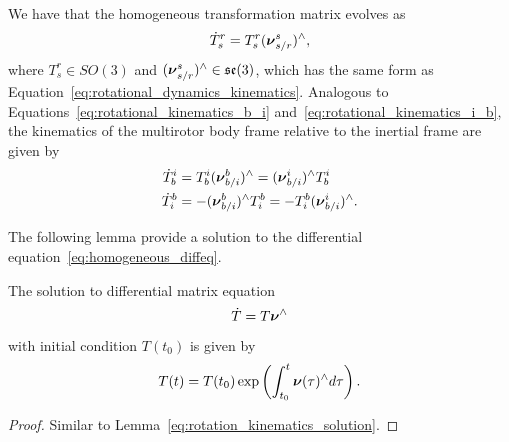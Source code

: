 We have that the homogeneous transformation matrix evolves as
\begin{equation}\label{eq:homogeneous_diffeq}
\dot{T}_s^r = T_s^r (\nubf_{s/r}^s)^\wedge,
\end{equation}
where $T_s^r\in SO(3)$ and $(\boldsymbol{\nu}_{s/r}^s)^\wedge\in\mathfrak{se}(3)$, 
which has the same form as Equation~\eqref{eq:rotational_dynamics_kinematics}.  Analogous to Equations~\eqref{eq:rotational_kinematics_b_i} and~\eqref{eq:rotational_kinematics_i_b}, the kinematics of the multirotor body frame relative to the inertial frame are given by
\begin{align}
\dot{T}_b^i &= T_b^i (\nubf_{b/i}^b)^\wedge = (\nubf_{b/i}^i)^\wedge T_b^i \label{eq:homogeneous_kinematics_b_i} \\
\dot{T}_i^b &= -(\nubf_{b/i}^b)^\wedge T_i^b = - T_i^b (\nubf_{b/i}^i)^\wedge.\label{eq:homogeneous_kinematics_i_b}
\end{align}

The following lemma provide a solution to the differential equation~\eqref{eq:homogeneous_diffeq}.
\begin{lemma}
The solution to differential matrix equation
\[
\dot{T} = T\boldsymbol{\nu}^\wedge
\]
with initial condition $T(t_0)$ is given by
\begin{equation}\label{eq:homogeneous_kinematics_solution}
T(t) = T(t_0)\exp\left(\int_{t_0}^t \nubf(\tau)^\wedge d\tau \right).
\end{equation}
\end{lemma}
\begin{proof}
Similar to Lemma~\ref{eq:rotation_kinematics_solution}.	
\end{proof}

